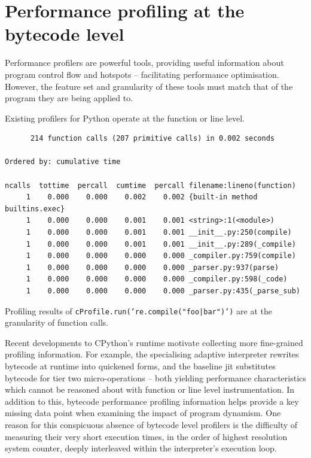 \chapter{Performance profiling at the bytecode level} %
\label{chap:profiling-bytecode}

Performance profilers are powerful tools, providing useful information about program control flow and hotspots -- facilitating performance optimisation.
However, the feature set and granularity of these tools must match that of the program they are being applied to.

Existing profilers for Python operate at the function or line level.

\vspace{1em}
\begin{code}
    \centering
    \begin{verbatim}
      214 function calls (207 primitive calls) in 0.002 seconds

Ordered by: cumulative time

ncalls  tottime  percall  cumtime  percall filename:lineno(function)
     1    0.000    0.000    0.002    0.002 {built-in method builtins.exec}
     1    0.000    0.000    0.001    0.001 <string>:1(<module>)
     1    0.000    0.000    0.001    0.001 __init__.py:250(compile)
     1    0.000    0.000    0.001    0.001 __init__.py:289(_compile)
     1    0.000    0.000    0.000    0.000 _compiler.py:759(compile)
     1    0.000    0.000    0.000    0.000 _parser.py:937(parse)
     1    0.000    0.000    0.000    0.000 _compiler.py:598(_code)
     1    0.000    0.000    0.000    0.000 _parser.py:435(_parse_sub)
    \end{verbatim}
        \caption{Profiling results of \texttt{cProfile.run('re.compile("foo|bar")')} are at the granularity of function calls.}
        \label{listing:cprofile-example}
\end{code}

Recent developments to CPython's runtime motivate collecting more fine-grained profiling information.
For example, the specialising adaptive interpreter rewrites bytecode at runtime into quickened forms, and the baseline \ac{jit} substitutes bytecode for tier two micro-operations -- both yielding performance characteristics which cannot be reasoned about with function or line level instrumentation.
In addition to this, bytecode performance profiling information helps provide a key missing data point when examining the impact of program dynamism.
One reason for this conspicuous absence of bytecode level profilers is the difficulty of measuring their very short execution times, in the order of highest resolution system counter, deeply interleaved within the interpreter's execution loop.

